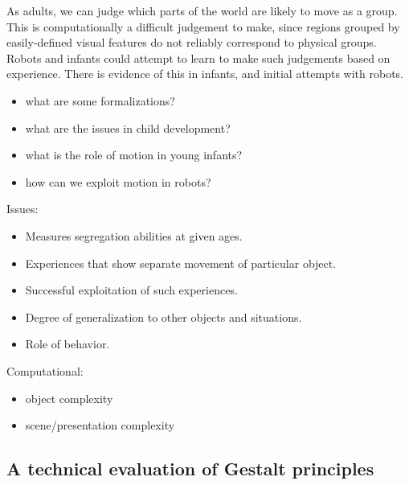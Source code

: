 As adults, we can judge which parts of the world
are likely to move as a group. This is computationally a difficult
judgement to make, since regions grouped by easily-defined visual
features do not reliably correspond to physical groups. Robots and
infants could attempt to learn to make such judgements based on
experience. There is evidence of this in infants, and initial attempts
with robots.



\begin{itemize}

\item what are some formalizations?

\item what are the issues in child development?

\item what is the role of motion in young infants?

\item how can we exploit motion in robots?

\end{itemize}



Issues:

\begin{itemize}

\item Measures segregation abilities at given ages.

\item Experiences that show separate movement of particular object.

\item Successful exploitation of such experiences.

\item Degree of generalization to other objects and situations.

\item Role of behavior.

\end{itemize}

Computational:

\begin{itemize}

\item object complexity

\item scene/presentation complexity

\end{itemize}


\subsection{A technical evaluation of Gestalt principles}

